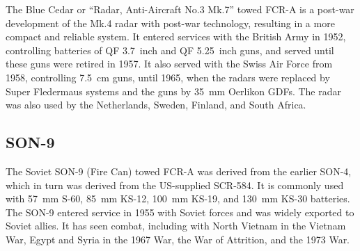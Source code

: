The Blue Cedar or “Radar, Anti-Aircraft No.3 Mk.7” towed FCR-A is a post-war development of the Mk.4 radar with post-war technology, resulting in a more compact and reliable system.
It entered services with the British Army in 1952, controlling batteries of QF 3.7~inch and QF 5.25~inch guns, and served until these guns were retired in 1957. It also served with the Swiss Air Force from 1958, controlling 7.5~cm guns, until 1965, when the radars were replaced by Super Fledermaus systems and the guns by 35~mm Oerlikon GDFs. The radar was also used by the Netherlands, Sweden, Finland, and South Africa.%

\subsection{SON-9}

The Soviet SON-9 (Fire Can) towed FCR-A was derived from the earlier SON-4, which in turn was derived from the US-supplied SCR-584.
It is commonly used with 57~mm S-60, 85~mm KS-12, 100~mm KS-19, and 130~mm KS-30 batteries.
The SON-9 entered service in 1955 with Soviet forces and was widely exported to Soviet allies.
It has seen combat, including with North Vietnam in the Vietnam War, Egypt and Syria in the 1967 War, the War of Attrition, and the 1973 War.%

